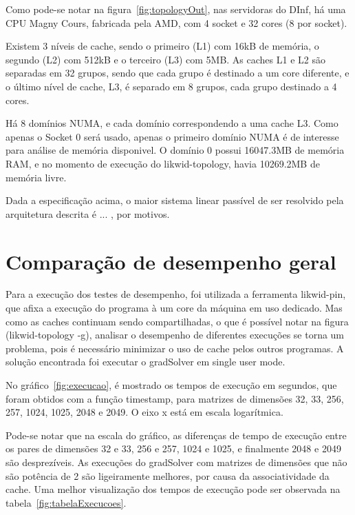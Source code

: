 \documentclass[12pt]{article}
\begin{document}
Como pode-se notar na figura~\ref{fig:topologyOut}, nas servidoras do DInf, há
uma CPU Magny Cours, fabricada pela AMD, com 4 socket e 32 cores (8 por socket).

Existem 3 níveis de cache, sendo o primeiro (L1) com 16kB de memória, o segundo
(L2) com 512kB e o terceiro (L3) com 5MB. As caches L1 e L2 são separadas em 32 grupos, sendo
que cada grupo é destinado a um core diferente, e o último nível de cache, L3, é
separado em 8 grupos, cada grupo destinado a 4 cores.

Há 8 domínios NUMA, e cada domínio correspondendo a uma cache L3. Como apenas o Socket 0 será
usado, apenas o primeiro domínio NUMA é de interesse para análise de memória disponivel. O 
domínio 0 possui 16047.3MB de memória RAM, e no momento de execução do likwid-topology,
havia 10269.2MB de memória livre.

Dada a especificação acima, o maior sistema linear passível de ser resolvido
pela arquitetura descrita é ... , por motivos.

\section{Comparação de desempenho geral}\label{sec:desempenhoGeral}

Para a execução dos testes de desempenho, foi utilizada a ferramenta likwid-pin,
que afixa a execução do programa à um core da máquina em uso dedicado. Mas como
as caches continuam sendo compartilhadas, o que é possível notar na figura
(likwid-topology -g), analisar o desempenho de diferentes execuções se torna um
problema, pois é necessário minimizar o uso de cache pelos outros programas. A
solução encontrada foi executar o gradSolver em single user mode.

No gráfico~\ref{fig:execucao}, é mostrado os tempos de execução em segundos, que
foram obtidos com a função timestamp, para matrizes de dimensões 32, 33, 256,
257, 1024, 1025, 2048 e 2049. O eixo x está em escala logarítmica.

Pode-se notar que na escala do gráfico, as diferenças de tempo de execução entre
os pares de dimensões 32 e 33, 256 e 257, 1024 e 1025, e finalmente 2048 e 2049
são desprezíveis. As execuções do gradSolver com matrizes de dimensões que não
são potência de 2 são ligeiramente melhores, por causa da associatividade da
cache. Uma melhor visualização dos tempos de execução pode ser observada na
tabela~\ref{fig:tabelaExecucoes}.
\end{document}
